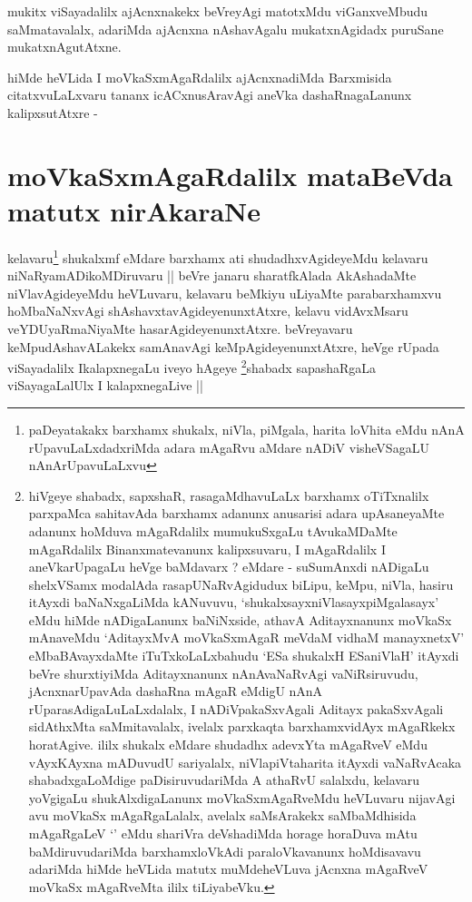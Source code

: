 \begin{artha}
mukitx viSayadalilx ajAcnxnakekx beVreyAgi matotxMdu viGanxveMbudu
saMmatavalalx, adariMda ajAcnxna nAshavAgalu mukatxnAgidadx puruSane mukatxnAgutAtxne.
\end{artha}


\begin{artha}
hiMde heVLida I moVkaSxmAgaRdalilx ajAcnxnadiMda Barxmisida
citatxvuLaLxvaru tananx icACxnusAravAgi aneVka dashaRnagaLanunx
kalipxsutAtxre -
\end{artha}

\section*{moVkaSxmAgaRdalilx mataBeVda matutx nirAkaraNe}


\begin{artha}
kelavaru\footnote{paDeyatakakx barxhamx shukalx, niVla, piMgala,
  harita loVhita eMdu nAnA rUpavuLaLxdadxriMda adara mAgaRvu aMdare
  nADiV visheVSagaLU nAnArUpavuLaLxvu} shukalxmf eMdare barxhamx ati shudadhxvAgideyeMdu
kelavaru niNaRyamADikoMDiruvaru || beVre janaru sharatfkAlada
AkAshadaMte niVlavAgideyeMdu heVLuvaru, kelavaru beMkiyu uLiyaMte
parabarxhamxvu hoMbaNaNxvAgi shAshavxtavAgideyenunxtAtxre, kelavu
vidAvxMsaru veYDUyaRmaNiyaMte hasarAgideyenunxtAtxre. beVreyavaru
keMpudAshavALakekx samAnavAgi keMpAgideyenunxtAtxre, heVge rUpada
viSayadalilx IkalapxnegaLu iveyo hAgeye \footnote{hiVgeye shabadx,
  sapxshaR, rasagaMdhavuLaLx barxhamx oTiTxnalilx parxpaMca sahitavAda
  barxhamx adanunx anusarisi adara upAsaneyaMte adanunx hoMduva
  mAgaRdalilx mumukuSxgaLu tAvukaMDaMte mAgaRdalilx Binanxmatevanunx
  kalipxsuvaru, I mAgaRdalilx I aneVkarUpagaLu heVge baMdavarx ?
  eMdare - suSumAnxdi nADigaLu shelxVSamx modalAda rasapUNaRvAgidudux
  biLipu, keMpu, niVla, hasiru itAyxdi baNaNxgaLiMda kANuvuvu,
  `shukalxsayxniVlasayxpiMgalasayx' eMdu hiMde nADigaLanunx
  baNiNxside, athavA Aditayxnanunx moVkaSx mAnaveMdu `AditayxMvA
  moVkaSxmAgaR meVdaM vidhaM manayxnetxV' eMbaBAvayxdaMte
  iTuTxkoLaLxbahudu `ESa shukalxH ESaniVlaH' itAyxdi beVre
  shurxtiyiMda Aditayxnanunx nAnAvaNaRvAgi vaNiRsiruvudu,
  jAcnxnarUpavAda dashaRna mAgaR eMdigU nAnA rUparasAdigaLuLaLxdalalx,
  I nADiVpakaSxvAgali Aditayx pakaSxvAgali sidAthxMta saMmitavalalx,
  ivelalx parxkaqta barxhamxvidAyx mAgaRkekx horatAgive. ililx shukalx
  eMdare shudadhx adevxYta mAgaRveV eMdu vAyxKAyxna mADuvudU
  sariyalalx, niVlapiVtaharita itAyxdi vaNaRvAcaka shabadxgaLoMdige
  paDisiruvudariMda A athaRvU salalxdu, kelavaru yoVgigaLu
  shukAlxdigaLanunx moVkaSxmAgaRveMdu heVLuvaru nijavAgi avu moVkaSx
  mAgaRgaLalalx, avelalx saMsArakekx saMbaMdhisida mAgaRgaLeV `\stext'
  eMdu shariVra deVshadiMda horage horaDuva mAtu baMdiruvudariMda
  barxhamxloVkAdi paraloVkavanunx hoMdisavavu adariMda hiMde heVLida
  matutx muMdeheVLuva jAcnxna mAgaRveV moVkaSx mAgaRveMta ililx tiLiyabeVku.}shabadx
sapashaRgaLa viSayagaLalUlx I kalapxnegaLive ||
\end{artha}

